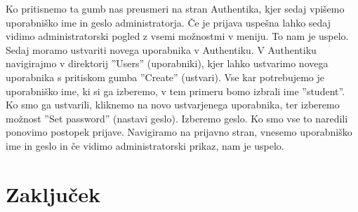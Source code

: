 \documentclass[a4paper,12pt,openright]{book}
\begin{document}
Ko pritisnemo ta gumb nas preusmeri na stran Authentika, kjer sedaj vpišemo uporabniško ime in geslo administratorja. Če je prijava uspešna lahko sedaj vidimo administratorski pogled z vsemi možnostmi v meniju. 
\newline
To nam je uspelo. Sedaj moramo ustvariti novega uporabnika v Authentiku. V Authentiku navigirajmo v direktorij ''Users'' (uporabniki), kjer lahko ustvarimo novega uporabnika s pritiskom gumba ''Create'' (ustvari). Vse kar potrebujemo je uporabniško ime, ki si ga izberemo, v tem primeru bomo izbrali ime ''student''. Ko smo ga ustvarili, kliknemo na novo ustvarjenega uporabnika, ter izberemo možnost ''Set password'' (nastavi geslo). Izberemo geslo.  
\newline
Ko smo vse to naredili ponovimo postopek prijave. Navigiramo na prijavno stran, vnesemo uporabniško ime in geslo in če vidimo administratorski prikaz, nam je uspelo. 
\newline

\chapter{Zaključek}
\end{document}
